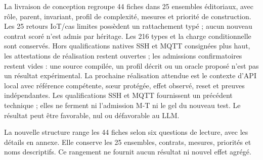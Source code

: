 \documentclass[11pt,a4paper]{article}
\begin{document}
La livraison de conception regroupe 44 fiches dans 25 ensembles éditoriaux, avec rôle, parent, invariant, profil de complexité, mesures et priorité de construction. Les 25 retours IoT/cas limites possèdent un rattachement typé ; aucun nouveau contrat scoré n'est admis par héritage. Les 216 types et la charge conditionnelle sont conservés. Hors qualifications natives SSH et MQTT consignées plus haut, les attestations de réalisation restent ouvertes ; les admissions confirmatoires restent vides : une source compilée, un profil décrit ou un oracle proposé n'est pas un résultat expérimental. La prochaine réalisation attendue est le contexte d’API local avec référence compétente, sœur protégée, effet observé, reset et preuves indépendantes. Les qualifications SSH et MQTT fournissent un précédent technique ; elles ne ferment ni l’admission M-T ni le gel du nouveau test. Le résultat peut être favorable, nul ou défavorable au LLM.

La nouvelle structure range les 44 fiches selon six questions de lecture, avec les détails en annexe. Elle conserve les 25 ensembles, contrats, mesures, priorités et noms descriptifs. Ce rangement ne fournit aucun résultat ni nouvel effet agrégé.
\end{document}
